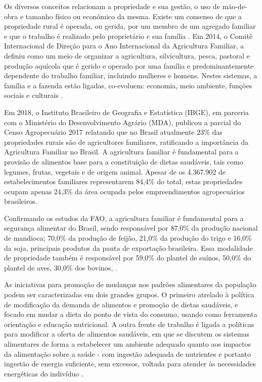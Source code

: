 Os diversos conceitos relacionam a propriedade e sua gestão, o uso de mão-de-obra e tamanho físico ou econômico da mesma. Existe um consenso de que a propriedade rural é operada, ou gerida, por um membro de um agregado familiar e que o trabalho é realizado pelo proprietário e sua família \cite{schneider_teoria_2003}. Em 2014, o Comitê Internacional de Direção para o Ano Internacional da Agricultura Familiar, a definiu como um meio de organizar a agricultura, silvicultura, pesca, pastoral e produção aquícola que é gerido e operado por uma família e predominantemente dependente do trabalho familiar, incluindo mulheres e homens. Nestes sistemas, a família e a fazenda estão ligadas, co-evoluem: economia, meio ambiente, funções sociais e culturais \cite{fao_innovation_2014}.

Em 2018, o Instituto Brasileiro de Geografia e Estatística (IBGE), em parceria com o Ministério do Desenvolvimento Agrário (MDA), publicou a parcial do Censo Agropecuário 2017 \cite{ibge_censo_2018} relatando que no Brasil atualmente 23\% das propriedades rurais são de agricultores familiares, ratificando a importância da Agricultura Familiar no Brasil. A agricultura familiar é fundamental para a provisão de alimentos base para a constituição de dietas saudáveis, tais como legumes, frutas, vegetais e de origem animal. Apesar de os 4.367.902 de estabelecimentos familiares representarem 84,4\% do total, estas propriedades ocupam apenas 24,3\% da área ocupada pelos empreendimentos agropecuários brasileiros. 

Confirmando os estudos da FAO, a agricultura familiar é fundamental para a  segurança alimentar do Brasil, sendo responsável por 87,0\% da produção nacional de mandioca; 70,0\% da produção de feijão, 21,0\% da produção do trigo e 16,0\% da soja, principais produtos da pauta de exportação brasileira. Essa modalidade de propriedade também é responsável por 59,0\% do plantel de suínos, 50,0\% do plantel de aves, 30,0\% dos bovinos, \cite{ibge_censo_2018}.


As iniciativas para promoção de mudanças nos padrões alimentares da população podem ser caracterizadas em dois grandes grupos. O primeiro atrelado à política de modificação da demanda de alimentos e promoção de dietas saudáveis, e focado em mudar a dieta do ponto de vista do consumo, usando como ferramenta orientação e educação nutricional. A outra frente de trabalho é ligada a políticas para modificar a oferta de alimentos saudáveis, em que se discutem os sistemas alimentares de forma a estabelecer um ambiente adequado quanto aos impactos da alimentação sobre a saúde - com ingestão adequada de nutrientes e portanto ingestão de energia suficiente, sem excessos, voltada para atender às necessidades energéticas do indivíduo \cite{maia_padroes_2018}.

